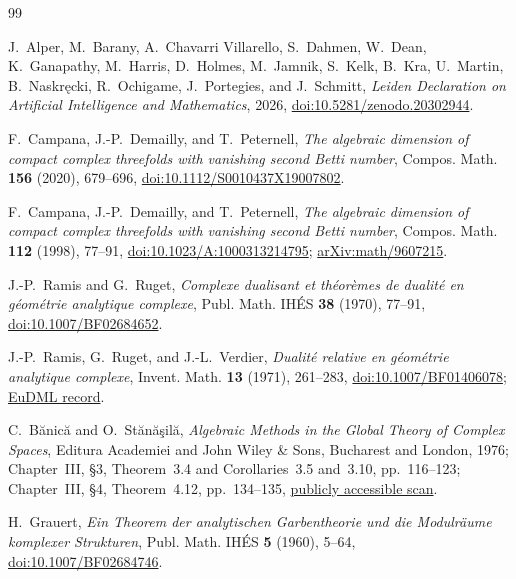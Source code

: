 \begin{thebibliography}{99}

J.~Alper, M.~Barany, A.~Chavarri Villarello, S.~Dahmen, W.~Dean,
K.~Ganapathy, M.~Harris, D.~Holmes, M.~Jamnik, S.~Kelk, B.~Kra,
U.~Martin, B.~Naskr\k{e}cki, R.~Ochigame, J.~Portegies, and J.~Schmitt,
\emph{Leiden Declaration on Artificial Intelligence and Mathematics},
2026,
\href{https://doi.org/10.5281/zenodo.20302944}{doi:10.5281/zenodo.20302944}.

F.~Campana, J.-P.~Demailly, and T.~Peternell,
\emph{The algebraic dimension of compact complex threefolds with vanishing
second Betti number},
Compos. Math. \textbf{156} (2020), 679--696,
\href{https://doi.org/10.1112/S0010437X19007802}{doi:10.1112/S0010437X19007802}.

F.~Campana, J.-P.~Demailly, and T.~Peternell,
\emph{The algebraic dimension of compact complex threefolds with vanishing
second Betti number},
Compos. Math. \textbf{112} (1998), 77--91,
\href{https://doi.org/10.1023/A:1000313214795}{doi:10.1023/A:1000313214795};
\href{https://arxiv.org/abs/math/9607215}{arXiv:math/9607215}.

J.-P.~Ramis and G.~Ruget,
\emph{Complexe dualisant et th\'eor\`emes de dualit\'e en g\'eom\'etrie
analytique complexe},
Publ. Math. IH\'ES \textbf{38} (1970), 77--91,
\href{https://doi.org/10.1007/BF02684652}{doi:10.1007/BF02684652}.

J.-P.~Ramis, G.~Ruget, and J.-L.~Verdier,
\emph{Dualit\'e relative en g\'eom\'etrie analytique complexe},
Invent. Math. \textbf{13} (1971), 261--283,
\href{https://doi.org/10.1007/BF01406078}{doi:10.1007/BF01406078};
\href{https://eudml.org/doc/142096}{EuDML record}.

C.~B\u{a}nic\u{a} and O.~St\u{a}n\u{a}\c{s}il\u{a},
\emph{Algebraic Methods in the Global Theory of Complex Spaces},
Editura Academiei and John Wiley \& Sons, Bucharest and London, 1976;
  Chapter~III, \S3, Theorem~3.4 and Corollaries~3.5 and~3.10, pp.~116--123;
  Chapter~III, \S4, Theorem~4.12, pp.~134--135,
  \href{https://djvu.online/file/2hQiOnz8WuoQk}{publicly accessible scan}.

H.~Grauert, \emph{Ein Theorem der analytischen Garbentheorie und die
Modulr\"aume komplexer Strukturen}, Publ. Math. IH\'ES \textbf{5} (1960),
5--64, \href{https://doi.org/10.1007/BF02684746}{doi:10.1007/BF02684746}.


\end{thebibliography}
